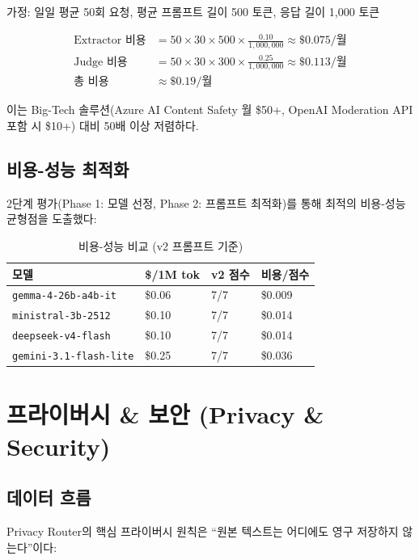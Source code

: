 \documentclass[11pt,a4paper]{article}
\begin{document}
가정: 일일 평균 50회 요청, 평균 프롬프트 길이 500 토큰, 응답 길이 1,000 토큰

\begin{align*}
\text{Extractor 비용} &= 50 \times 30 \times 500 \times \frac{0.10}{1{,}000{,}000} \approx \$0.075/\text{월} \\
\text{Judge 비용} &= 50 \times 30 \times 300 \times \frac{0.25}{1{,}000{,}000} \approx \$0.113/\text{월} \\
\text{총 비용} &\approx \$0.19/\text{월}
\end{align*}

이는 Big-Tech 솔루션(Azure AI Content Safety 월 \$50+, OpenAI Moderation API 포함 시 \$10+) 대비 50배 이상 저렴하다.

\subsection{비용-성능 최적화}

2단계 평가(Phase 1: 모델 선정, Phase 2: 프롬프트 최적화)를 통해 최적의 비용-성능 균형점을 도출했다:

\begin{table}[h]
\centering
\begin{tabular}{@{}llll@{}}
\toprule
모델 & \$/1M tok & v2 점수 & 비용/점수 \\
\midrule
\texttt{gemma-4-26b-a4b-it} & \$0.06 & 7/7 & \$0.009 \\
\texttt{ministral-3b-2512} & \$0.10 & 7/7 & \$0.014 \\
\texttt{deepseek-v4-flash} & \$0.10 & 7/7 & \$0.014 \\
\texttt{gemini-3.1-flash-lite} & \$0.25 & 7/7 & \$0.036 \\
\bottomrule
\end{tabular}
\caption{비용-성능 비교 (v2 프롬프트 기준)}
\end{table}

\section{프라이버시 \& 보안 (Privacy \& Security)}

\subsection{데이터 흐름}

Privacy Router의 핵심 프라이버시 원칙은 ``원본 텍스트는 어디에도 영구 저장하지 않는다''이다:
\end{document}

